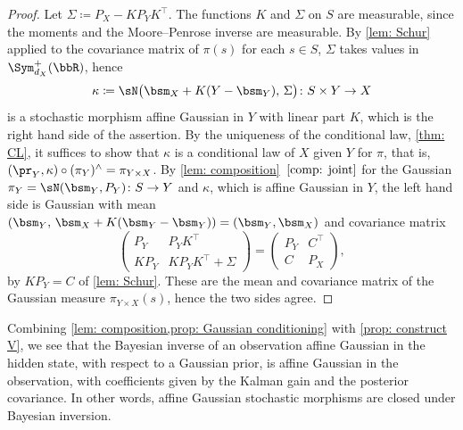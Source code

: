 \documentclass[12pt,reqno]{amsart}%
\theoremstyle{plain}
\theoremstyle{definition}
\def\R{\bbR}
\begin{document}
\begin{proof}
	Let $\Sigma\coloneqq P_X-KP_YK^{\top}$.  The functions $K$ and $\Sigma$ on $S$ are measurable,
	since the moments and the Moore--Penrose inverse are measurable.
	By \cref{lem: Schur} applied to the covariance matrix of $\pi(s)$ for each $s\in S$,
	$\Sigma$ takes values in $\Sym^+_{d_X}(\R)$, hence
	\[
		\kappa\coloneqq\sN\bigl(\bsm_X+K(Y-\bsm_Y),\,\Sigma\bigr)\colon S\times Y\rightarrow X
	\]
	is a stochastic morphism affine Gaussian in $Y$ with linear part $K$, which is the right hand side of the assertion.
	By the uniqueness of the conditional law, \cref{thm: CL}, it suffices to show that $\kappa$ is a conditional law
	of $X$ given $Y$ for $\pi$, that is, $(\pr_Y,\kappa)\circ(\pi_Y)^\wedge=\pi_{Y\times X}$.
	By \cref{lem: composition}~$\ref{comp: joint}$ for the Gaussian $\pi_Y=\sN(\bsm_Y,P_Y)\colon S\rightarrow Y$
	and $\kappa$, which is affine Gaussian in $Y$, the left hand side is Gaussian with mean
	$(\bsm_Y,\,\bsm_X+K(\bsm_Y-\bsm_Y))=(\bsm_Y,\bsm_X)$ and covariance matrix
	\[
		\begin{pmatrix}P_Y & P_YK^{\top}\\ KP_Y & KP_YK^{\top}+\Sigma\end{pmatrix}
		=\begin{pmatrix}P_Y & C^{\top}\\ C & P_X\end{pmatrix},
	\]
	by $KP_Y=C$ of \cref{lem: Schur}.
	These are the mean and covariance matrix of the Gaussian measure $\pi_{Y\times X}(s)$,
	hence the two sides agree.
\end{proof}

Combining \cref{lem: composition,prop: Gaussian conditioning} with \cref{prop: construct V}, we see that
the Bayesian inverse of an observation affine Gaussian in the hidden state, with respect to a Gaussian prior,
is affine Gaussian in the observation,
with coefficients given by the Kalman gain and the posterior covariance.
In other words, affine Gaussian stochastic morphisms are closed under Bayesian inversion.
\end{document}
